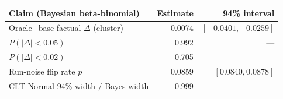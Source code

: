 \begin{tabular}{lrr}
\toprule
Claim (Bayesian beta-binomial) & Estimate & 94\% interval\\
\midrule
Oracle$-$base factual $\Delta$ (cluster) & -0.0074 & $[-0.0401,+0.0259]$\\
\quad $P(|\Delta|<0.05)$ & 0.992 & ---\\
\quad $P(|\Delta|<0.02)$ & 0.705 & ---\\
\midrule
Run-noise flip rate $p$ & 0.0859 & $[0.0840,0.0878]$\\
\quad CLT Normal 94\% width / Bayes width & 0.999 & ---\\
\bottomrule
\end{tabular}
